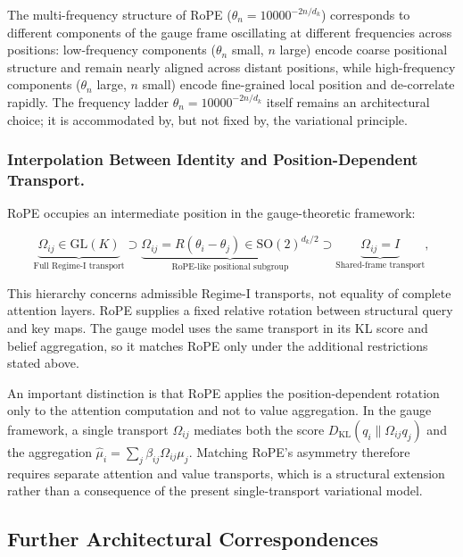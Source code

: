 \documentclass[twoside,11pt]{article}
\begin{document}
The multi-frequency structure of RoPE ($\theta_n = 10000^{-2n/d_k}$) corresponds to different components of the gauge frame oscillating at different frequencies across positions: low-frequency components ($\theta_n$ small, $n$ large) encode coarse positional structure and remain nearly aligned across distant positions, while high-frequency components ($\theta_n$ large, $n$ small) encode fine-grained local position and de-correlate rapidly. The frequency ladder $\theta_n = 10000^{-2n/d_k}$ itself remains an architectural choice; it is accommodated by, but not fixed by, the variational principle. 

\subsubsection{Interpolation Between Identity and Position-Dependent Transport.}

RoPE occupies an intermediate position in the gauge-theoretic framework:

\begin{equation}
\underbrace{\Omega_{ij}\in\mathrm{GL}(K)}_{\text{Full Regime-I transport}} \supset
\underbrace{\Omega_{ij}=R(\theta_i-\theta_j)\in\mathrm{SO}(2)^{d_k/2}}_{\text{RoPE-like positional subgroup}} \supset
\underbrace{\Omega_{ij}=I}_{\text{Shared-frame transport}},
\end{equation}

This hierarchy concerns admissible Regime-I transports, not equality of complete attention layers. RoPE supplies a fixed relative rotation between structural query and key maps. The gauge model uses the same transport in its KL score and belief aggregation, so it matches RoPE only under the additional restrictions stated above.

An important distinction is that RoPE applies the position-dependent rotation only to the attention computation and not to value aggregation. In the gauge framework, a single transport $\Omega_{ij}$ mediates both the score $D_{\mathrm{KL}}(q_i \| \Omega_{ij} q_j)$ and the aggregation $\hat\mu_i = \sum_j \beta_{ij}\Omega_{ij}\mu_j$. Matching RoPE's asymmetry therefore requires separate attention and value transports, which is a structural extension rather than a consequence of the present single-transport variational model.


\subsection{Further Architectural Correspondences}
\label{sec:further_correspondences}
\end{document}

